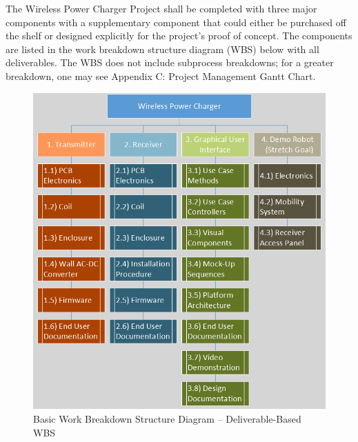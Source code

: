 \documentclass[12pt]{article}
\begin{document}
\indent \indent
The Wireless Power Charger Project shall be completed with three major components with a supplementary component that could either be purchased off the shelf or designed explicitly for the project’s proof of concept.   The components are listed in the work breakdown structure diagram (WBS) below with all deliverables.  The WBS does not include subprocess breakdowns; for a greater breakdown, one may see Appendix C: Project Management Gantt Chart.

\pagebreak

\begin{figure}[h!]
\centering
\includegraphics[width=1.00\linewidth]{wbs_deliverable}
\caption{Basic Work Breakdown Structure Diagram -- Deliverable-Based WBS}
\end{figure}
\hfill \\

\pagebreak
\end{document}
